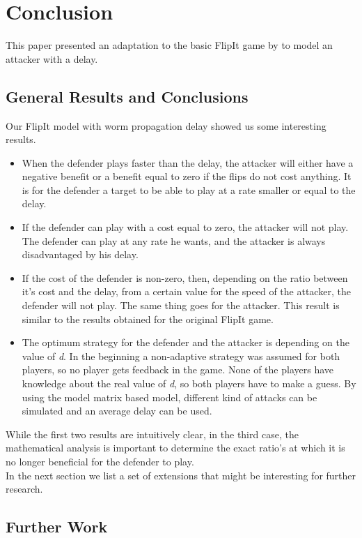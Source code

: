 \chapter{Conclusion}
\label{chapter5:conclusion}

This paper presented an adaptation to the basic FlipIt game by \citep{FlipIt} to model an attacker with a delay.  

\section{General Results and Conclusions}
Our FlipIt model with worm propagation delay showed us some interesting results. 
\begin{itemize}
\item When the defender plays faster than the delay, the attacker will either have a negative benefit or a benefit equal to zero if the flips do not cost anything. It is for the defender a target to be able to play at a rate smaller or equal to the delay.
\item If the defender can play with a cost equal to zero, the attacker will not play. The defender can play at any rate he wants, and the attacker is always disadvantaged by his delay.
\item If the cost of the defender is non-zero, then, depending on the ratio between it's cost and the delay, from a certain value for the speed of the attacker, the defender will not play. The same thing goes for the attacker. This result is similar to the results obtained for the original FlipIt game.
\item The optimum strategy for the defender and the attacker is depending on the value of \textit{d}. In the beginning a non-adaptive strategy was assumed for both players, so no player gets feedback in the game. None of the players have knowledge about the real value of \textit{d}, so both players have to make a guess. By using the model matrix based model, different kind of attacks can be simulated and an average delay can be used. 
\end{itemize}

While the first two results are intuitively clear, in the third case, the mathematical analysis is important to determine the exact ratio's at which it is no longer beneficial for the defender to play. \\
In the next section we list a set of extensions that might be interesting for further research.
\section{Further Work}

